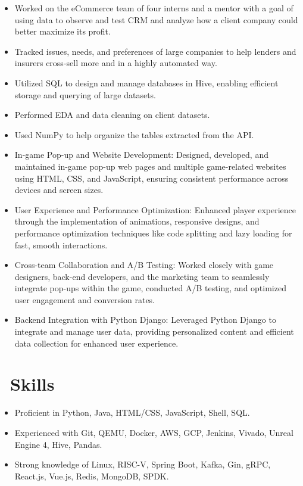 \documentclass{resume}
\begin{document}
\begin{itemize}
  \item Worked on the eCommerce team of four interns and a mentor with a goal of using data to observe and test CRM and analyze how a client company could better maximize its profit.
  \item Tracked issues, needs, and preferences of large companies to help lenders and insurers cross-sell more and in a highly automated way.
  \item Utilized SQL to design and manage databases in Hive, enabling efficient storage and querying of large datasets.
  \item Performed EDA and data cleaning on client datasets.
  \item Used NumPy to help organize the tables extracted from the API.
\end{itemize}

\begin{itemize}
  \item In-game Pop-up and Website Development: Designed, developed, and maintained in-game pop-up web pages and multiple game-related websites using HTML, CSS, and JavaScript, ensuring consistent performance across devices and screen sizes.
  \item User Experience and Performance Optimization: Enhanced player experience through the implementation of animations, responsive designs, and performance optimization techniques like code splitting and lazy loading for fast, smooth interactions.
  \item Cross-team Collaboration and A/B Testing: Worked closely with game designers, back-end developers, and the marketing team to seamlessly integrate pop-ups within the game, conducted A/B testing, and optimized user engagement and conversion rates.
  \item Backend Integration with Python Django: Leveraged Python Django to integrate and manage user data, providing personalized content and efficient data collection for enhanced user experience.
\end{itemize}

\section{\faCogs\ Skills}
\begin{itemize}[parsep=0.5ex]
  \item Proficient in Python, Java, HTML/CSS, JavaScript, Shell, SQL.
  \item Experienced with Git, QEMU, Docker, AWS, GCP, Jenkins, Vivado, Unreal Engine 4, Hive, Pandas.
  \item Strong knowledge of Linux, RISC-V, Spring Boot, Kafka, Gin, gRPC, React.js, Vue.js, Redis, MongoDB, SPDK.
\end{itemize}

\pagebreak
\end{document}
